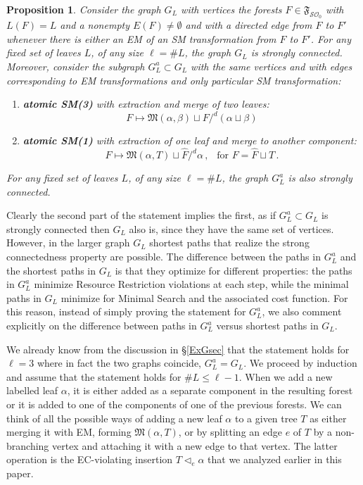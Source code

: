 \documentclass[12pt]{amsart}
\newtheorem{prop}{Proposition}[section]
\numberwithin{equation}{section}
\def\cO{{\mathcal O}}
\def\cS{{\mathcal S}}
\def\fM{{\mathfrak M}}
\def\fF{{\mathfrak F}}
\begin{document}
\begin{prop}\label{strongconngen}
Consider the graph $G_L$ with vertices the
forests $F\in \fF_{\cS\cO_0}$ with $L(F)=L$ and a nonempty $E(F)\neq \emptyset$ and with
a directed edge from $F$ to $F'$ whenever there is either an EM of an SM transformation
from $F$ to $F'$. For any fixed set of leaves $L$, of any size $\ell=\# L$, the graph $G_L$ is
strongly connected. Moreover, consider the subgraph $G^a_L \subset G_L$ with the
same vertices and with edges corresponding to EM transformations and only  
particular SM transformation:
\begin{enumerate}
\item {\bf atomic SM(3)} with extraction and merge of two leaves: $$F \mapsto \fM(\alpha,\beta)\sqcup F/^d (\alpha \sqcup \beta)$$
\item {\bf atomic SM(1)} with extraction of one leaf and merge to another component:
$$F\mapsto \fM(\alpha, T) \sqcup \hat F/^d \alpha\, , \ \ \text{ for }  F=\hat F \sqcup T \, . $$
\end{enumerate}
For any fixed set of leaves $L$, of any size $\ell=\# L$, the graph $G^a_L$ is also
strongly connected.
\end{prop}

\proof Clearly the second part of the statement implies the first, as if $G^a_L \subset G_L$ is
strongly connected then $G_L$ also is, since they have the same set of vertices. However,
in the larger graph $G_L$ shortest paths that realize the strong connectedness property
are possible. The difference between the paths in $G^a_L$ and the shortest paths in $G_L$
is that they optimize for different properties: the paths in $G^a_L$ minimize Resource Restriction
violations at each step, while the minimal paths in $G_L$ minimize for Minimal Search and
the associated cost function. For this reason, instead of simply proving the statement for
$G^a_L$, we also comment explicitly on the difference between
paths in $G^a_L$ versus shortest paths in $G_L$.

\smallskip

We already know from the discussion in \S \ref{ExGsec} that the statement holds for $\ell=3$
where in fact the two graphs coincide, $G^a_L =G_L$.
We proceed by induction and assume that the statement holds for $\# L \leq \ell-1$. 
When we add a new labelled leaf $\alpha$, it is either added as a separate component in the 
resulting forest or it is added to one of the components of one of the previous forests. We can think of
all the possible ways of adding a new leaf $\alpha$ to a given tree $T$ as either merging it with EM,
forming $\fM(\alpha, T)$, or by splitting an edge $e$ of $T$ by a non-branching vertex and attaching it with a 
new edge to that vertex. The latter operation is the EC-violating insertion $T \lhd_e \alpha$ that we
analyzed earlier in this paper. 
\end{document}
